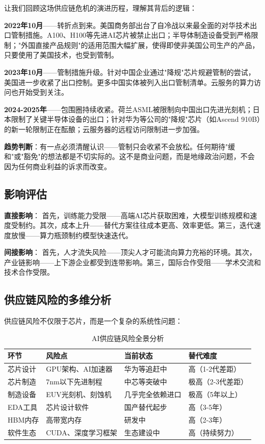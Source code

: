 让我们回顾这场供应链危机的演进历程，理解其背后的逻辑：

\textbf{2022年10月}——转折点到来。美国商务部出台了自冷战以来最全面的对华技术出口管制措施。A100、H100等先进AI芯片被禁止出口；半导体制造设备受到严格限制；"外国直接产品规则"的适用范围大幅扩展，使得即使非美国公司生产的产品，只要使用了美国技术，也受到管制。

\textbf{2023年10月}——管制措施升级。针对中国企业通过"降规"芯片规避管制的尝试，美国进一步收紧了出口控制。更多中国实体被列入出口管制清单。云服务的算力访问也开始受到关注。

\textbf{2024-2025年}——包围圈持续收紧。荷兰ASML被限制向中国出口先进光刻机；日本限制了关键半导体设备的出口；针对华为等公司的"降规"芯片（如Ascend 910B）的新一轮限制正在酝酿；云服务器的远程访问限制进一步加强。

\textbf{趋势判断}：有一点必须清醒认识——管制只会收紧不会放松。任何期待"缓和"或"豁免"的想法都是不切实际的。这不是商业问题，而是地缘政治问题，不会因为任何商业利益的诉求而改变。

\subsection{影响评估}

\textbf{直接影响}：
首先，训练能力受限——高端AI芯片获取困难，大模型训练规模和速度受制约。其次，成本上升——替代方案往往成本更高、效率更低。第三，迭代速度放慢——算力瓶颈制约模型快速迭代。

\textbf{间接影响}：
首先，人才流失风险——顶尖人才可能流向算力充裕的环境。其次，产业链影响——上下游企业都受到连带影响。第三，国际合作受阻——学术交流和技术合作受限。

\subsection{供应链风险的多维分析}

供应链风险不仅限于芯片，而是一个复杂的系统性问题：

\begin{table}[H]
\centering
\caption{AI供应链风险全景分析}
\small
\begin{tabular}{p{2.5cm}p{3.5cm}p{3cm}p{3cm}}
\toprule
\textbf{环节} & \textbf{风险点} & \textbf{当前状态} & \textbf{替代难度} \\
\midrule
芯片设计 & GPU架构、AI加速器 & 华为等追赶中 & 高（1-2代差距） \\
芯片制造 & 7nm以下先进制程 & 中芯等突破中 & 极高（2-3代差距） \\
制造设备 & EUV光刻机、刻蚀机 & 几乎完全依赖进口 & 极高（5年以上） \\
EDA工具 & 芯片设计软件 & 国产替代起步 & 高（3-5年） \\
HBM内存 & 高带宽内存 & 研发中 & 高（2-3年） \\
软件生态 & CUDA、深度学习框架 & 生态建设中 & 高（持续努力） \\
\bottomrule
\end{tabular}
\end{table}

